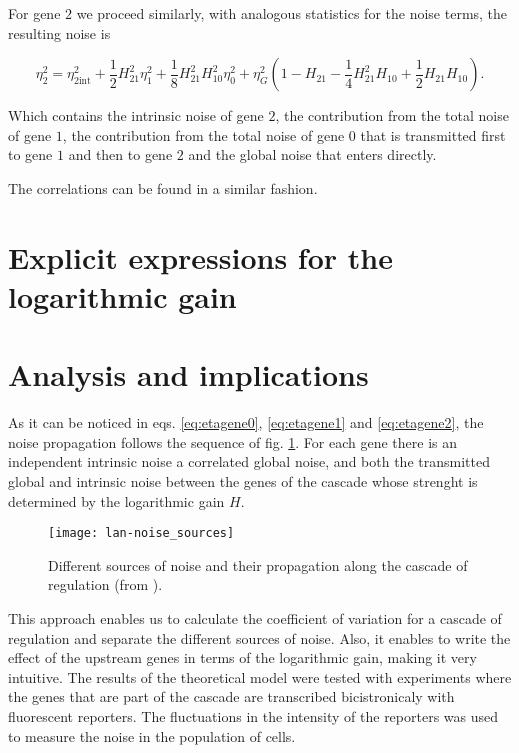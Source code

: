
For gene $2$ we proceed similarly, with analogous statistics for the noise terms, the resulting noise is

\begin{equation}
  \label{eq:etagene2}
  \boxed{\eta_2^2 = \eta_{2\text{int}}^2 + \frac{1}{2}H_{21}^2\eta_1^2+\frac{1}{8}H_{21}^2H_{10}^2\eta_0^2+\eta_G^2\left(1-H_{21}-\frac{1}{4}H_{21}^2H_{10}+\frac{1}{2}H_{21}H_{10}\right)}.
\end{equation}

Which contains the intrinsic noise of gene $2$, the contribution from the total noise of gene $1$, the contribution from the total noise of gene $0$ that is transmitted first to gene $1$ and then to gene $2$ and the global noise that enters directly. 

The correlations can be found in a similar fashion.


\section{Explicit expressions for the logarithmic gain}



\section{Analysis and implications}

As it can be noticed in eqs. \eqref{eq:etagene0}, \eqref{eq:etagene1} and \eqref{eq:etagene2}, the noise propagation follows the sequence of fig. \ref{fig:lan-noise_sources}. For each gene there is an independent intrinsic noise a correlated global noise, and both the transmitted global and intrinsic noise between the genes of the cascade whose strenght is determined by the logarithmic gain $H$.

\begin{figure}[H]
  \centering
  \texttt{[image: lan-noise\_sources]}
  \caption[Propagation of noise through a cascade]{\label{fig:lan-noise_sources} Different sources of noise and their propagation along the cascade of regulation (from \cite{pedraza05}).}
\end{figure}


This approach enables us to calculate the coefficient of variation for a cascade of regulation and separate the different sources of noise. Also, it enables to write the effect of the upstream genes in terms of the logarithmic gain, making it very intuitive. The results of the theoretical model were tested with experiments where the genes that are part of the cascade are transcribed bicistronicaly with fluorescent reporters. The fluctuations in the intensity of the reporters was used to measure the noise in the population of cells.
